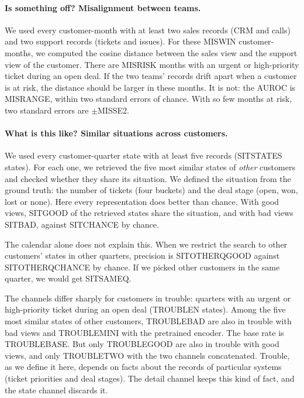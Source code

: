 \documentclass[11pt]{article}
\begin{document}
\paragraph{Is something off? Misalignment between teams.} We used every customer-month with at least two sales records (CRM and calls) and two support records (tickets and issues). For these MISWIN customer-months, we computed the cosine distance between the sales view and the support view of the customer. There are MISRISK months with an urgent or high-priority ticket during an open deal. If the two teams' records drift apart when a customer is at risk, the distance should be larger in these months. It is not: the AUROC is MISRANGE, within two standard errors of chance. With so few months at risk, two standard errors are $\pm$MISSE2.

\paragraph{What is this like? Similar situations across customers.} We used every customer-quarter state with at least five records (SITSTATES states). For each one, we retrieved the five most similar states of \emph{other} customers and checked whether they share its situation. We defined the situation from the ground truth: the number of tickets (four buckets) and the deal stage (open, won, lost or none). Here every representation does better than chance. With good views, SITGOOD of the retrieved states share the situation, and with bad views SITBAD, against SITCHANCE by chance.

The calendar alone does not explain this. When we restrict the search to other customers' states in other quarters, precision is SITOTHERQGOOD against SITOTHERQCHANCE by chance. If we picked other customers in the same quarter, we would get SITSAMEQ.

The channels differ sharply for customers in trouble: quarters with an urgent or high-priority ticket during an open deal (TROUBLEN states). Among the five most similar states of other customers, TROUBLEBAD are also in trouble with bad views and TROUBLEMINI with the pretrained encoder. The base rate is TROUBLEBASE. But only TROUBLEGOOD are also in trouble with good views, and only TROUBLETWO with the two channels concatenated. Trouble, as we define it here, depends on facts about the records of particular systems (ticket priorities and deal stages). The detail channel keeps this kind of fact, and the state channel discards it.
\end{document}
